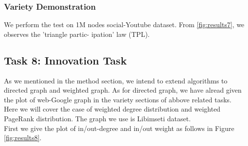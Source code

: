 \subsubsection{Variety Demonstration}
We perform the test on 1M nodes social-Youtube dataset. From \ref{fig:results7}, we observes the ’triangle partic- ipation’ law (TPL).

 \subsection{Task 8: Innovation Task}
 As we mentioned in the method section, we intend to extend algorithms to directed graph and weighted graph. As for directed graph, we have alread given the plot of web-Google graph in the variety sections of abbove related tasks. \\
 Here we will cover the case of weighted degree distribution and weighted PageRank distribution. The graph we use is Libimseti dataset.\\
 First we give the plot of in/out-degree and in/out weight as follows in Figure \ref{fig:results8}. \\
